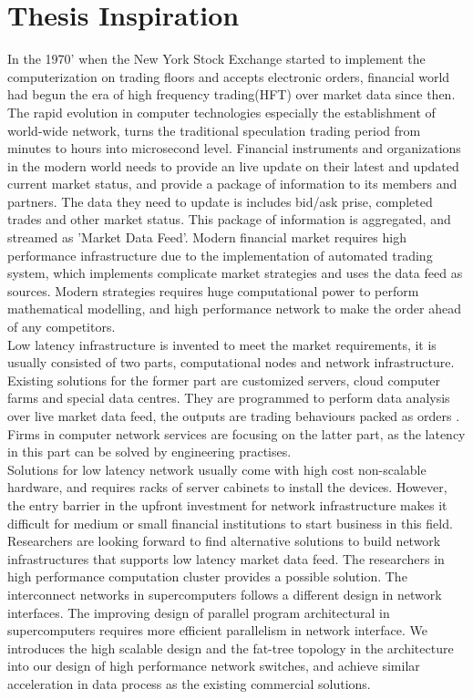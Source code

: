 \documentclass[11pt,openright,a4paper]{report}
\begin{document}
\section{Thesis Inspiration}
In the 1970' when the New York Stock Exchange started to implement the computerization on trading floors and accepts electronic orders, financial world had begun the era of high frequency trading(HFT) over market data since then\cite{mcgowan2010rise}. The rapid evolution in computer technologies especially the establishment of world-wide network, turns the traditional speculation trading period from minutes to hours into microsecond level. Financial instruments and organizations in the modern world needs to provide an live update on their latest and updated current market status, and provide a package of information to its members and partners. The data they need to update is includes bid/ask prise, completed trades and other market status\cite{alexander2001market}. This package of information is aggregated, and streamed as 'Market Data Feed'. Modern financial market requires high performance infrastructure due to the implementation of automated trading system, which implements complicate market strategies and uses the data feed as sources\cite{le2009automated}. Modern strategies requires huge computational power to perform mathematical modelling, and high performance network to make the order ahead of any competitors.\\
Low latency infrastructure is invented to meet the market requirements, it is usually consisted of two parts,  computational nodes and network infrastructure. Existing solutions for the former part are customized servers, cloud computer farms and special data centres. They are programmed to perform data analysis over live market data feed, the outputs are trading behaviours packed as orders . Firms in computer network services are focusing on the latter part, as the latency in this part can be solved by engineering practises.\\
Solutions for low latency network usually come with high cost non-scalable hardware, and requires racks of server cabinets to install the devices. However, the entry barrier in the upfront investment for network infrastructure makes it difficult for medium or small financial institutions to start business in this field.\\
Researchers are looking forward to find alternative solutions to build network infrastructures that supports low latency market data feed. The researchers in high performance computation cluster provides a possible solution. The interconnect networks in supercomputers follows a different design in network interfaces. The improving design of parallel program architectural in supercomputers requires more efficient parallelism in network interface\cite{pang2014th}. We introduces the high scalable design and the fat-tree topology in the architecture into our design of high performance network switches, and achieve similar acceleration in data process as the existing commercial solutions.\\
\end{document}
